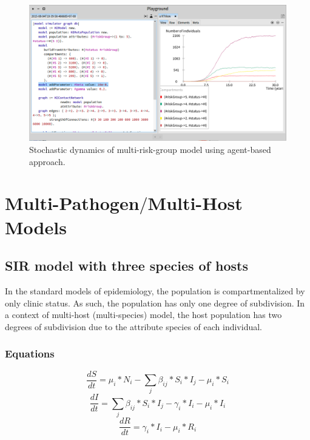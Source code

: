 \documentclass[a4paper,10pt,twoside]{book}
\begin{document}
\begin{figure}

\begin{center}
\includegraphics[width=1.0\textwidth]{figures/Multi_Risk_IBM.png}\caption{Stochastic dynamics of multi-risk-group model using agent-based approach.\label{Multi_Risk_IBM}}\end{center}
\end{figure}

\chapter{ Multi-Pathogen$/$Multi-Host Models}\section{ SIR model with three species of hosts}
In the standard models of epidemiology, the population is compartmentalized by only clinic status.
As such, the population has only one degree of subdivision.
In a context of multi-host (multi-species) model, the host population has two degrees of subdivision due to the attribute species of each individual.
\subsection{ Equations}

  \begin{equation}
    \frac{dS}{dt} = \mu_i*N_i - \sum_j \beta_{ij}*S_i*I_j - \mu_i*S_i
  \end{equation}
  \begin{equation}
    \frac{dI}{dt} = \sum_j \beta_{ij}*S_i*I_j - \gamma_i*I_i - \mu_i*I_i
  \end{equation}
  \begin{equation}
    \frac{dR}{dt} = \gamma_i*I_i - \mu_i*R_i
  \end{equation}
  
\end{document}
